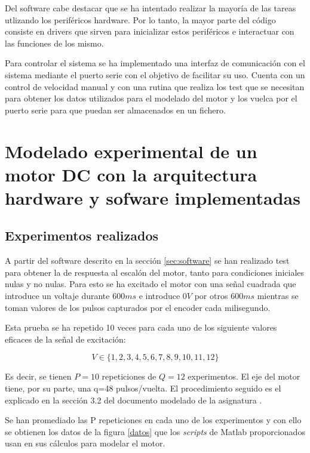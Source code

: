 \documentclass[a4paper]{article}
\begin{document}
Del software cabe destacar que se ha intentado realizar la mayoría de las tareas utlizando los periféricos hardware. Por lo tanto,
la mayor parte del código consiste en drivers que sirven para inicializar estos periféricos e interactuar con las funciones de los mismo.

Para controlar el sistema se ha implementado una interfaz de comunicación con el sistema mediante el puerto serie con el objetivo de facilitar su uso.
Cuenta con un control de velocidad manual y con una rutina que realiza los test que se necesitan para obtener los datos utilizados para el modelado del motor y los vuelca
por el puerto serie para que puedan ser almacenados en un fichero.

\section{Modelado experimental de un motor DC con la arquitectura hardware y sofware implementadas}
\subsection{Experimentos realizados \label{sec:exp}}
A partir del software descrito en la sección \ref{sec:software} se han realizado test para obtener la de respuesta al escalón del motor,
tanto para condiciones iniciales nulas y no nulas.
Para esto se ha excitado el motor con una señal cuadrada que introduce un voltaje durante $600ms$ e introduce $0V$ por otros $600ms$
mientras se toman valores de los pulsos capturados por el encoder cada milisegundo.

Esta prueba se ha repetido 10 veces para cada uno de los siguiente valores eficaces de la señal de excitación:

\begin{displaymath}
V \in \{1,2,3,4,5,6,7,8,9,10,11,12\}
\end{displaymath}

Es decir, se tienen $P=10$ repeticiones de $Q=12$ experimentos. El eje del motor tiene, por su parte, una q=48 pulsos/vuelta.
El procedimiento seguido es el explicado en la sección 3.2 del documento modelado de la asignatura \cite{modelado}.

Se han promediado las P repeticiones en cada uno de los experimentos y con ello se obtienen los datos de la figura \ref{datos} que los \emph{scripts}
de Matlab proporcionados usan en sus cálculos para modelar el motor.
\end{document}
